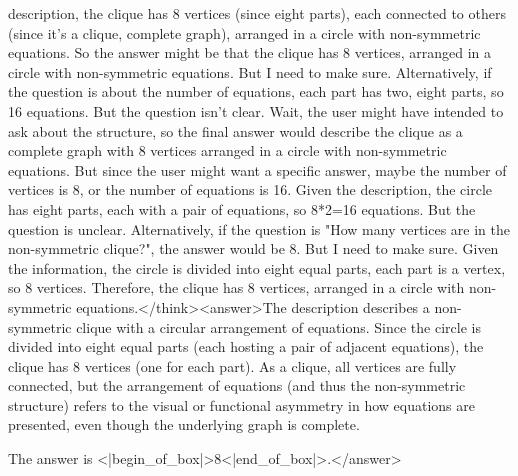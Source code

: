 description, the clique has 8 vertices (since eight parts), each connected to others (since it's a clique, complete graph), arranged in a circle with non-symmetric equations. So the answer might be that the clique has 8 vertices, arranged in a circle with non-symmetric equations. But I need to make sure. Alternatively, if the question is about the number of equations, each part has two, eight parts, so 16 equations. But the question isn't clear. Wait, the user might have intended to ask about the structure, so the final answer would describe the clique as a complete graph with 8 vertices arranged in a circle with non-symmetric equations. But since the user might want a specific answer, maybe the number of vertices is 8, or the number of equations is 16. Given the description, the circle has eight parts, each with a pair of equations, so 8*2=16 equations. But the question is unclear. Alternatively, if the question is "How many vertices are in the non-symmetric clique?", the answer would be 8. But I need to make sure. Given the information, the circle is divided into eight equal parts, each part is a vertex, so 8 vertices. Therefore, the clique has 8 vertices, arranged in a circle with non-symmetric equations.</think><answer>The description describes a non-symmetric clique with a circular arrangement of equations. Since the circle is divided into eight equal parts (each hosting a pair of adjacent equations), the clique has 8 vertices (one for each part). As a clique, all vertices are fully connected, but the arrangement of equations (and thus the non-symmetric structure) refers to the visual or functional asymmetry in how equations are presented, even though the underlying graph is complete.  

The answer is <|begin_of_box|>8<|end_of_box|>.</answer>